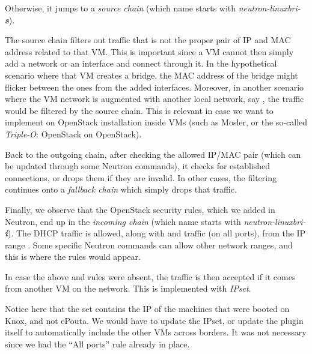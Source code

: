 
Otherwise, it jumps to a \emph{source chain} (which name starts with
\emph{neutron-linuxbri-\textbf{s}}).


The source chain filters out traffic that is not the proper pair of IP
and MAC address related to that VM. This is important since a VM
cannot then simply add a network or an interface and connect through
it. In the hypothetical scenario where that VM creates a bridge, the
MAC address of the bridge might flicker between the ones from the
added interfaces. Moreover, in another scenario where the VM network
is augmented with another local network, say , the
traffic would be filtered by the source chain. This is relevant in
case we want to implement on OpenStack installation inside VMs (such
as Mosler, or the so-called \emph{Triple-O}: OpenStack on OpenStack).

Back to the outgoing chain, after checking the allowed IP/MAC pair
(which can be updated through some Neutron commands), it checks for
established connections, or drops them if they are invalid. In other
cases, the filtering continues onto a \emph{fallback chain} which
simply drops that traffic.


Finally, we observe that the OpenStack security rules, which we added
in Neutron, end up in the \emph{incoming chain} (which name starts
with \emph{neutron-linuxbri-\textbf{i}}). The DHCP traffic is allowed,
along with  and  traffic (on all ports), from the IP
range . Some specific Neutron commands can allow
other network ranges, and this is where the rules would appear.


In case the above  and  rules were absent, the
traffic is then accepted if it comes from another VM on the
network. This is implemented with \emph{IPset}.


Notice here that the set contains the IP of the machines that were
booted on Knox, and not ePouta. We would have to update the IPset, or
update the plugin itself to automatically include the other VMs across
borders. It was not necessary since we had the ``All  ports''
rule already in place.
